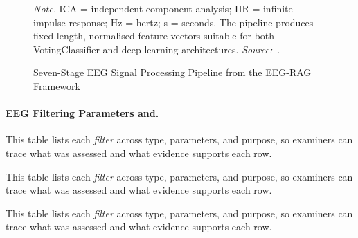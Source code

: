 \begin{figure}[!htbp]
{%
}
\caption[Seven-Stage EEG Signal Processing Pipeline]{Seven-Stage EEG Signal Processing Pipeline from the EEG-RAG Framework}
\label{fig:eeg_signal_pipeline}
\vspace{0.5em}\noindent\textit{Note.} ICA = independent component analysis; IIR = infinite impulse response; Hz = hertz; s = seconds. The pipeline produces fixed-length, normalised feature vectors suitable for both VotingClassifier and deep learning architectures. \textit{Source:}~\cite{asthana2025eegmaster}.
\end{figure}

\paragraph{EEG Filtering Parameters and.}



\noindent This table lists each \textit{filter} across type, parameters, and purpose, so examiners can trace what was assessed and what evidence supports each row.



\noindent This table lists each \textit{filter} across type, parameters, and purpose, so examiners can trace what was assessed and what evidence supports each row.


\noindent This table lists each \textit{filter} across type, parameters, and purpose, so examiners can trace what was assessed and what evidence supports each row.



